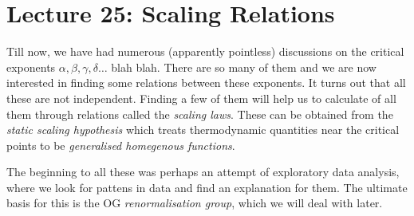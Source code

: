 \section*{Lecture 25: Scaling Relations}
Till now, we have had numerous (apparently pointless) discussions on the critical exponents $\alpha, \beta, \gamma, \delta\ldots$ blah blah. There are so many of them and we are now interested in finding some relations between these exponents. It turns out that all these are not independent. Finding a few of them will help us to calculate of all them through relations called the \textit{scaling laws}. These can be obtained from the \textit{static scaling hypothesis} which treats thermodynamic quantities near the critical points to be \textit{generalised homegenous functions}.

The beginning to all these was perhaps an attempt of exploratory data analysis, where we look for pattens in data and find an explanation for them. The ultimate basis for this is the OG \textit{renormalisation group}, which we will deal with later. 

